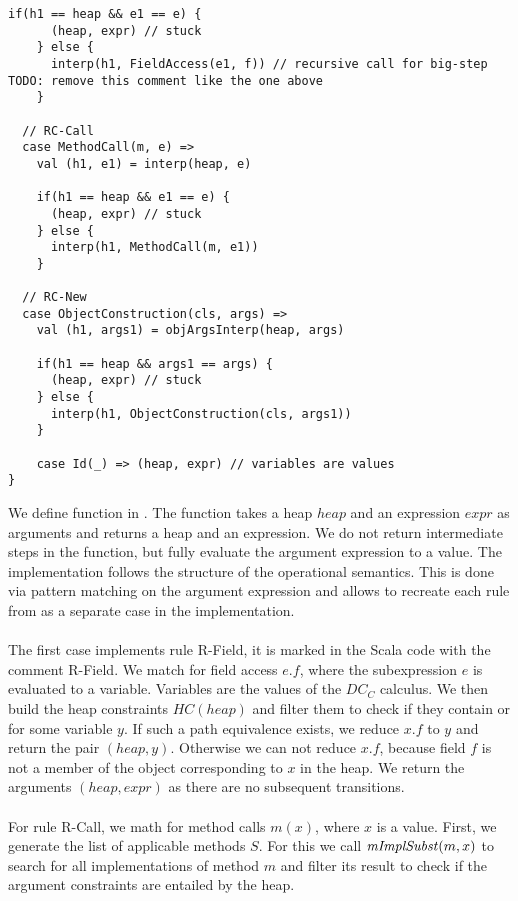 \begin{lstlisting}[caption={Interpreter},label=lst:interp,captionpos=b,frame={lines}]
    if(h1 == heap && e1 == e) {
      (heap, expr) // stuck
    } else {
      interp(h1, FieldAccess(e1, f)) // recursive call for big-step TODO: remove this comment like the one above
    }
    
  // RC-Call
  case MethodCall(m, e) =>
    val (h1, e1) = interp(heap, e)

    if(h1 == heap && e1 == e) {
      (heap, expr) // stuck
    } else {
      interp(h1, MethodCall(m, e1))
    }
    
  // RC-New
  case ObjectConstruction(cls, args) =>
    val (h1, args1) = objArgsInterp(heap, args)

    if(h1 == heap && args1 == args) {
      (heap, expr) // stuck
    } else {
      interp(h1, ObjectConstruction(cls, args1))
    }
    
    case Id(_) => (heap, expr) // variables are values
}
\end{lstlisting}
%
\newpage
We define function  in .
The function takes a heap $heap$ and an expression $expr$
as arguments and returns a heap and an expression.
We do not return intermediate steps in the function,
but fully evaluate the argument expression to a value.
The implementation follows the structure of the operational
semantics.
This is done via pattern matching on the argument expression
and allows to recreate each rule from 
as a separate case in the implementation.\\
\\
The first case implements rule R-Field,
it is marked in the Scala code with the comment R-Field.
We match for field access $e.f$, where the subexpression $e$
is evaluated to a variable.
Variables are the values of the $DC_C$ calculus.
We then build the heap constraints $HC(heap)$
and filter them to check if they contain 
or  for some variable $y$.
If such a path equivalence exists, we
reduce $x.f$ to $y$ and return
the pair $(heap, y)$.
Otherwise we can not reduce $x.f$,
because field $f$ is not a member of the object
corresponding to $x$ in the heap.
We return the arguments $(heap, expr)$
as there are no subsequent transitions.\\
\\
For rule R-Call, we math for method calls $m(x)$,
where $x$ is a value.
First, we generate the list of applicable methods $S$.
For this we call $\mathit{mImplSubst}(m, x)$
to search for all implementations of method $m$
and filter its result to check if the
argument constraints are entailed by the heap.
